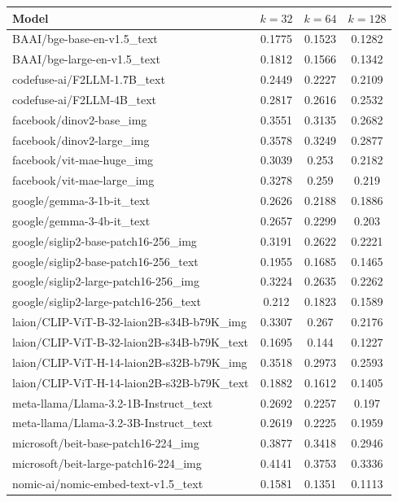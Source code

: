 \begin{table}[ht]
\centering
\begin{tabular}{lccc}
\hline
Model & $k=32$ & $k=64$ & $k=128$ \\
\hline
BAAI/bge-base-en-v1.5\_text & 0.1775 & 0.1523 & 0.1282 \\
BAAI/bge-large-en-v1.5\_text & 0.1812 & 0.1566 & 0.1342 \\
codefuse-ai/F2LLM-1.7B\_text & 0.2449 & 0.2227 & 0.2109 \\
codefuse-ai/F2LLM-4B\_text & 0.2817 & 0.2616 & 0.2532 \\
facebook/dinov2-base\_img & 0.3551 & 0.3135 & 0.2682 \\
facebook/dinov2-large\_img & 0.3578 & 0.3249 & 0.2877 \\
facebook/vit-mae-huge\_img & 0.3039 & 0.253 & 0.2182 \\
facebook/vit-mae-large\_img & 0.3278 & 0.259 & 0.219 \\
google/gemma-3-1b-it\_text & 0.2626 & 0.2188 & 0.1886 \\
google/gemma-3-4b-it\_text & 0.2657 & 0.2299 & 0.203 \\
google/siglip2-base-patch16-256\_img & 0.3191 & 0.2622 & 0.2221 \\
google/siglip2-base-patch16-256\_text & 0.1955 & 0.1685 & 0.1465 \\
google/siglip2-large-patch16-256\_img & 0.3224 & 0.2635 & 0.2262 \\
google/siglip2-large-patch16-256\_text & 0.212 & 0.1823 & 0.1589 \\
laion/CLIP-ViT-B-32-laion2B-s34B-b79K\_img & 0.3307 & 0.267 & 0.2176 \\
laion/CLIP-ViT-B-32-laion2B-s34B-b79K\_text & 0.1695 & 0.144 & 0.1227 \\
laion/CLIP-ViT-H-14-laion2B-s32B-b79K\_img & 0.3518 & 0.2973 & 0.2593 \\
laion/CLIP-ViT-H-14-laion2B-s32B-b79K\_text & 0.1882 & 0.1612 & 0.1405 \\
meta-llama/Llama-3.2-1B-Instruct\_text & 0.2692 & 0.2257 & 0.197 \\
meta-llama/Llama-3.2-3B-Instruct\_text & 0.2619 & 0.2225 & 0.1959 \\
microsoft/beit-base-patch16-224\_img & 0.3877 & 0.3418 & 0.2946 \\
microsoft/beit-large-patch16-224\_img & 0.4141 & 0.3753 & 0.3336 \\
nomic-ai/nomic-embed-text-v1.5\_text & 0.1581 & 0.1351 & 0.1113 \\

\end{tabular}
\end{table}
